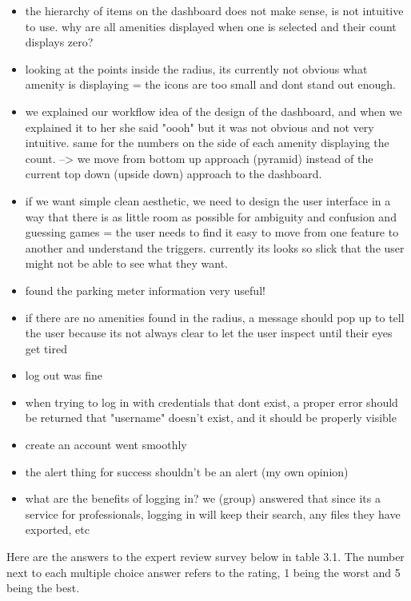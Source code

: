 \documentclass{report}
\begin{document}
\begin{itemize}
    \item the hierarchy of items on the dashboard does not make sense, is not intuitive to use. why are all amenities displayed when one is selected and their count displays zero?
    \item looking at the points inside the radius, its currently not obvious what amenity is displaying = the icons are too small and dont stand out enough.
    \item we explained our workflow idea of the design of the dashboard, and when we explained it to her she said "oooh" but it was not obvious and not very intuitive. same for the numbers on the side of each amenity displaying the count. --> we move from bottom up approach (pyramid) instead of the current top down (upside down) approach to the dashboard.
    \item if we want simple clean aesthetic, we need to design the user interface in a way that there is as little room as possible for ambiguity and confusion and guessing games = the user needs to find it easy to move from one feature to another and understand the triggers. currently its looks so slick that the user might not be able to see what they want.
    \item found the parking meter information very useful!
    \item if there are no amenities found in the radius, a message should pop up to tell the user because its not always clear to let the user inspect until their eyes get tired
    \item log out was fine
    \item when trying to log in with credentials that dont exist, a proper error should be returned that "username" doesn't exist, and it should be properly visible
    \item create an account went smoothly
    \item the alert thing for success shouldn't be an alert (my own opinion)
    \item what are the benefits of logging in? we (group) answered that since its a service for professionals, logging in will keep their search, any files they have exported, etc
\end{itemize}
Here are the answers to the expert review survey below in table 3.1. The number next to each multiple choice answer refers to the rating, 1 being the worst and 5 being the best.
\end{document}
